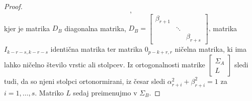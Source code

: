 \documentclass[mat1]{article}
\theoremstyle{definition}
\begin{document}
\begin{proof}
$$%
\text{,}
$$ kjer je matrika $D_B$ diagonalna matrika, 
$  D_B = 
\begin{bmatrix}
\beta_{r+1} & & \\
 & \ddots & \\
 & & \beta_{r+s} 
\end{bmatrix}\text{,}$
matrika $I_{k-r-s, k-r-s}$ identična matrika ter matrika $0_{p-k+r, r}$ ničelna matrika, ki ima lahko ničelno število vrstic ali stolpcev.
Iz ortogonalnosti matrike $\begin{bmatrix}
\Sigma_A \\
L
\end{bmatrix}$ sledi tudi, da so njeni stolpci ortonormirani, iz česar sledi $\alpha_{r+i}^2 + \beta_{r+i}^2 = 1$ za $i = 1, \ldots, s$. Matriko $L$ sedaj preimenujmo v $\Sigma_B$.


\end{proof}
\end{document}
